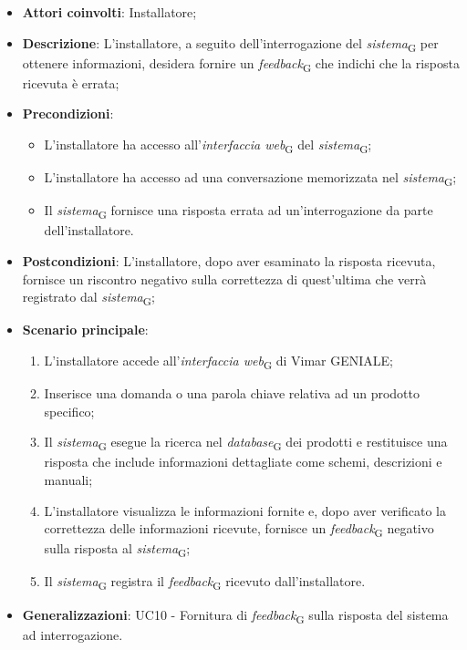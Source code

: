 \begin{itemize}
    \item \textbf{Attori coinvolti}: Installatore;
    \item \textbf{Descrizione}: L’installatore, a seguito dell’interrogazione del \textit{sistema}\textsubscript{G} per ottenere informazioni, desidera fornire un \textit{feedback}\textsubscript{G} che indichi che la risposta ricevuta è errata;
    \item \textbf{Precondizioni}: 
    \begin{itemize}
        \item L’installatore ha accesso all’\textit{interfaccia web}\textsubscript{G} del \textit{sistema}\textsubscript{G};
        \item L’installatore ha accesso ad una conversazione memorizzata nel \textit{sistema}\textsubscript{G};
        \item Il \textit{sistema}\textsubscript{G} fornisce una risposta errata ad un’interrogazione da parte dell’installatore.
    \end{itemize}
    \item \textbf{Postcondizioni}: L’installatore, dopo aver esaminato la risposta ricevuta, fornisce un riscontro negativo sulla correttezza di quest’ultima che verrà registrato dal \textit{sistema}\textsubscript{G};
    \item \textbf{Scenario principale}:
    \begin{enumerate}
        \item L’installatore accede all’\textit{interfaccia web}\textsubscript{G} di Vimar GENIALE;
        \item Inserisce una domanda o una parola chiave relativa ad un prodotto specifico;
        \item Il \textit{sistema}\textsubscript{G} esegue la ricerca nel \textit{database}\textsubscript{G} dei prodotti e restituisce una risposta che include informazioni dettagliate come schemi, descrizioni e manuali;
        \item L’installatore visualizza le informazioni fornite e, dopo aver verificato la correttezza delle informazioni ricevute, fornisce un \textit{feedback}\textsubscript{G} negativo sulla risposta al \textit{sistema}\textsubscript{G};
        \item Il \textit{sistema}\textsubscript{G} registra il \textit{feedback}\textsubscript{G} ricevuto dall’installatore.
    \end{enumerate}
    \item \textbf{Generalizzazioni}: UC10 - Fornitura di \textit{feedback}\textsubscript{G} sulla risposta del sistema ad interrogazione.
\end{itemize}



